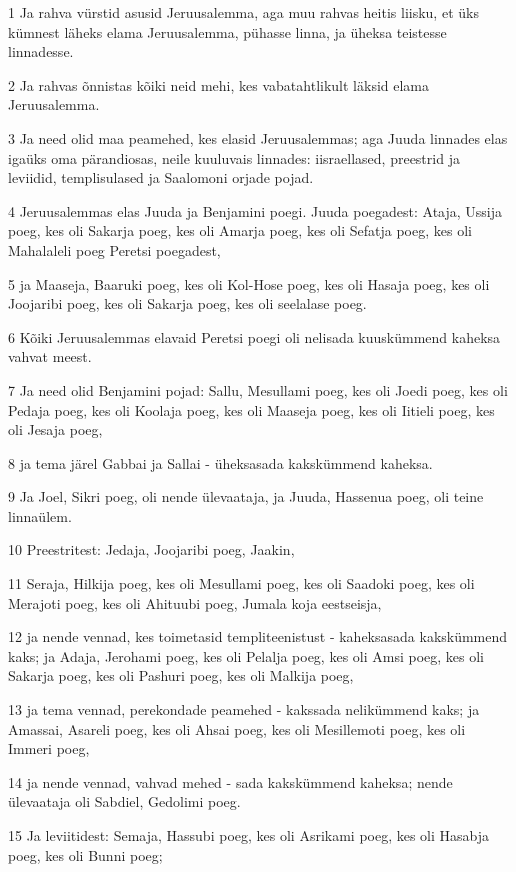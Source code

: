 \par 1 Ja rahva vürstid asusid Jeruusalemma, aga muu rahvas heitis liisku, et üks kümnest läheks elama Jeruusalemma, pühasse linna, ja üheksa teistesse linnadesse.
\par 2 Ja rahvas õnnistas kõiki neid mehi, kes vabatahtlikult läksid elama Jeruusalemma.
\par 3 Ja need olid maa peamehed, kes elasid Jeruusalemmas; aga Juuda linnades elas igaüks oma pärandiosas, neile kuuluvais linnades: iisraellased, preestrid ja leviidid, templisulased ja Saalomoni orjade pojad.
\par 4 Jeruusalemmas elas Juuda ja Benjamini poegi. Juuda poegadest: Ataja, Ussija poeg, kes oli Sakarja poeg, kes oli Amarja poeg, kes oli Sefatja poeg, kes oli Mahalaleli poeg Peretsi poegadest,
\par 5 ja Maaseja, Baaruki poeg, kes oli Kol-Hose poeg, kes oli Hasaja poeg, kes oli Joojaribi poeg, kes oli Sakarja poeg, kes oli seelalase poeg.
\par 6 Kõiki Jeruusalemmas elavaid Peretsi poegi oli nelisada kuuskümmend kaheksa vahvat meest.
\par 7 Ja need olid Benjamini pojad: Sallu, Mesullami poeg, kes oli Joedi poeg, kes oli Pedaja poeg, kes oli Koolaja poeg, kes oli Maaseja poeg, kes oli Iitieli poeg, kes oli Jesaja poeg,
\par 8 ja tema järel Gabbai ja Sallai - üheksasada kakskümmend kaheksa.
\par 9 Ja Joel, Sikri poeg, oli nende ülevaataja, ja Juuda, Hassenua poeg, oli teine linnaülem.
\par 10 Preestritest: Jedaja, Joojaribi poeg, Jaakin,
\par 11 Seraja, Hilkija poeg, kes oli Mesullami poeg, kes oli Saadoki poeg, kes oli Merajoti poeg, kes oli Ahituubi poeg, Jumala koja eestseisja,
\par 12 ja nende vennad, kes toimetasid templiteenistust - kaheksasada kakskümmend kaks; ja Adaja, Jerohami poeg, kes oli Pelalja poeg, kes oli Amsi poeg, kes oli Sakarja poeg, kes oli Pashuri poeg, kes oli Malkija poeg,
\par 13 ja tema vennad, perekondade peamehed - kakssada nelikümmend kaks; ja Amassai, Asareli poeg, kes oli Ahsai poeg, kes oli Mesillemoti poeg, kes oli Immeri poeg,
\par 14 ja nende vennad, vahvad mehed - sada kakskümmend kaheksa; nende ülevaataja oli Sabdiel, Gedolimi poeg.
\par 15 Ja leviitidest: Semaja, Hassubi poeg, kes oli Asrikami poeg, kes oli Hasabja poeg, kes oli Bunni poeg;

